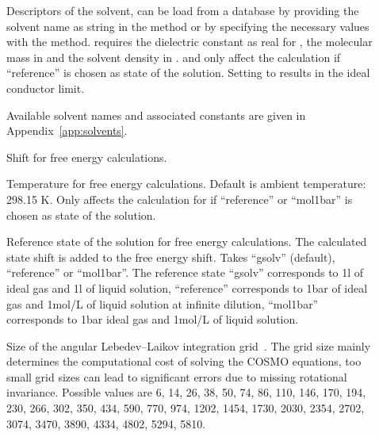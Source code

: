 \begin{description}
  \item[] Descriptors of the solvent, can be load from a database
    by providing the solvent name as string in the  method or
    by specifying the necessary values with the  method.
     requires the dielectric constant as real for ,
    the molecular mass in   and the
    solvent density in  .
     and  only affect the calculation if
    ``reference'' is chosen as state of the solution.
    Setting  to  results in the ideal conductor limit.

    Available solvent names and associated constants are given in Appendix~\ref{app:solvents}.

  \item[]  Shift for free energy
    calculations.

  \item[] Temperature for free energy calculations. Default is
    ambient temperature: 298.15 K.
    Only affects the calculation for if ``reference'' or ``mol1bar'' is chosen
    as state of the solution.

  \item[] 
    Reference state of the solution for free energy calculations.
    The calculated state shift is added to the free energy shift.
    Takes ``gsolv'' (default), ``reference'' or ``mol1bar''.
    The reference state ``gsolv'' corresponds to 1\;l of ideal gas and 1\;l of
    liquid  solution,
    ``reference'' corresponds to 1\;bar of ideal gas and 1\;mol/L of liquid
    solution at infinite dilution,
    ``mol1bar'' corresponds to 1\;bar ideal gas and 1\;mol/L of liquid solution.

  \item[]
    Size of the angular Lebedev--Laikov integration grid~\cite{lebedev1999}.
    The grid size mainly determines the computational cost of solving the
    COSMO equations, too small grid sizes can lead to significant errors
    due to missing rotational invariance.
    Possible values are
    6, 14, 26, 38, 50, 74, 86, 110, 146, 170, 194, 230, 266, 302, 350,
    434, 590, 770, 974, 1202, 1454, 1730, 2030, 2354, 2702, 3074, 3470, 3890,
    4334, 4802, 5294, 5810.


\end{description}
